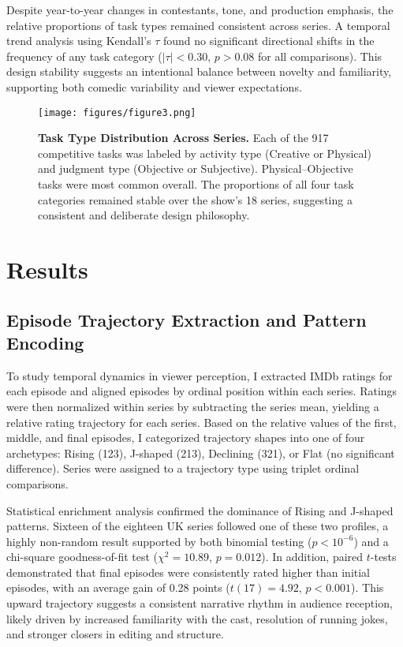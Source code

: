 \documentclass[10pt,letterpaper]{article}
\begin{document}
Despite year-to-year changes in contestants, tone, and production emphasis, the relative proportions of task types remained consistent across series. A temporal trend analysis using Kendall’s $\tau$ found no significant directional shifts in the frequency of any task category ($|\tau| < 0.30$, $p > 0.08$ for all comparisons). This design stability suggests an intentional balance between novelty and familiarity, supporting both comedic variability and viewer expectations.

\begin{figure}[!h]
\centering
\texttt{[image: figures/figure3.png]}
\caption{{\bf Task Type Distribution Across Series.}
Each of the 917 competitive tasks was labeled by activity type (Creative or Physical) and judgment type (Objective or Subjective). Physical–Objective tasks were most common overall. The proportions of all four task categories remained stable over the show’s 18 series, suggesting a consistent and deliberate design philosophy.}
\label{fig:task_format}
\end{figure}
\FloatBarrier





\section*{Results}


\subsection*{Episode Trajectory Extraction and Pattern Encoding}

To study temporal dynamics in viewer perception, I extracted IMDb ratings for each episode and aligned episodes by ordinal position within each series. Ratings were then normalized within series by subtracting the series mean, yielding a relative rating trajectory for each series. Based on the relative values of the first, middle, and final episodes, I categorized trajectory shapes into one of four archetypes: Rising (123), J-shaped (213), Declining (321), or Flat (no significant difference). Series were assigned to a trajectory type using triplet ordinal comparisons.

Statistical enrichment analysis confirmed the dominance of Rising and J-shaped patterns. Sixteen of the eighteen UK series followed one of these two profiles, a highly non-random result supported by both binomial testing ($p < 10^{-6}$) and a chi-square goodness-of-fit test ($\chi^2 = 10.89$, $p = 0.012$). In addition, paired $t$-tests demonstrated that final episodes were consistently rated higher than initial episodes, with an average gain of 0.28 points ($t(17) = 4.92$, $p < 0.001$). This upward trajectory suggests a consistent narrative rhythm in audience reception, likely driven by increased familiarity with the cast, resolution of running jokes, and stronger closers in editing and structure.
\end{document}
